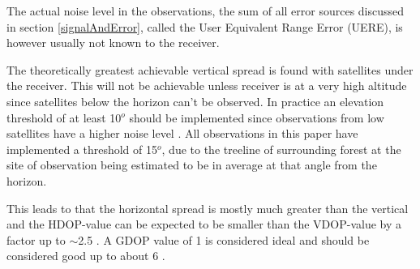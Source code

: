 The actual noise level in the observations, the sum of all error sources discussed in section \ref{signalAndError}, called the User Equivalent Range Error (UERE), is however usually not known to the receiver.
\par
The theoretically greatest achievable vertical spread is found with satellites under the receiver. This will not be achievable unless receiver is at a very high altitude since satellites below the horizon can't be observed. In practice an elevation threshold of at least 10$^o$ should be implemented since observations from low satellites have a higher noise level \cite{tatarnikov2014approaching}. All observations in this paper have implemented a threshold of 15$^o$, due to the treeline of surrounding forest at the site of observation being estimated to be in average at that angle from the horizon.
\par
This leads to that the horizontal spread is mostly much greater than the vertical and the HDOP-value can be expected to be smaller than the VDOP-value by a factor up to $\sim$2.5 \cite{langley1999dilution}. A GDOP value of 1 is considered ideal and should be considered good up to about 6 \cite{GDOPbelow6}.

